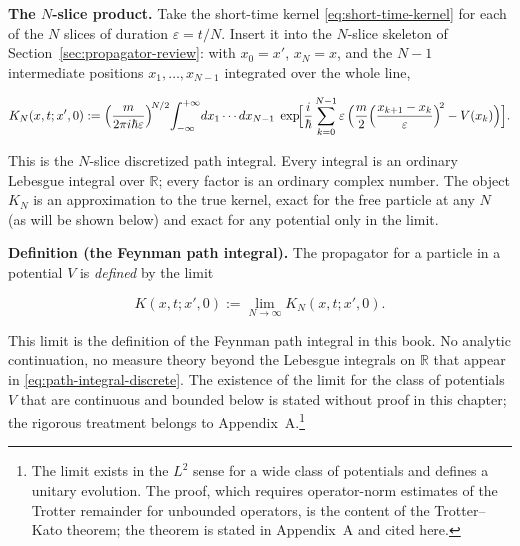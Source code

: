 \medskip\noindent\textbf{The $N$-slice product.} Take the short-time kernel \eqref{eq:short-time-kernel} for each of the $N$ slices of duration $\varepsilon = t/N$. Insert it into the $N$-slice skeleton of Section~\ref{sec:propagator-review}: with $x_0 = x'$, $x_N = x$, and the $N-1$ intermediate positions $x_1,\ldots,x_{N-1}$ integrated over the whole line,
\begin{linenomath}
\begin{equation}
K_N(x,t;x',0) := \Bigl(\frac{m}{2\pi i\hbar\varepsilon}\Bigr)^{\!N/2}\!
\int_{-\infty}^{+\infty}\!dx_1\cdots dx_{N-1}\;
\exp\!\Bigl[\frac{i}{\hbar}\sum_{k=0}^{N-1}\varepsilon\,
\Bigl(\frac{m}{2}\Bigl(\frac{x_{k+1}-x_k}{\varepsilon}\Bigr)^{\!2}
- V(x_k)\Bigr)\Bigr] .
\label{eq:path-integral-discrete}
\end{equation}
\end{linenomath}
This is the $N$-slice discretized path integral. Every integral is an ordinary Lebesgue integral over $\mathbb{R}$; every factor is an ordinary complex number. The object $K_N$ is an approximation to the true kernel, exact for the free particle at any $N$ (as will be shown below) and exact for any potential only in the limit.

\medskip\noindent\textbf{Definition (the Feynman path integral).} The propagator for a particle in a potential $V$ is \emph{defined} by the limit
\begin{linenomath}
\begin{equation}
K(x,t;x',0) := \lim_{N\to\infty} K_N(x,t;x',0) .
\end{equation}
\end{linenomath}
This limit is the definition of the Feynman path integral in this book. No analytic continuation, no measure theory beyond the Lebesgue integrals on $\mathbb{R}$ that appear in \eqref{eq:path-integral-discrete}. The existence of the limit for the class of potentials $V$ that are continuous and bounded below is stated without proof in this chapter; the rigorous treatment belongs to Appendix~A.\footnote{The limit exists in the $L^2$ sense for a wide class of potentials and defines a unitary evolution. The proof, which requires operator-norm estimates of the Trotter remainder for unbounded operators, is the content of the Trotter--Kato theorem; the theorem is stated in Appendix~A and cited here.}

